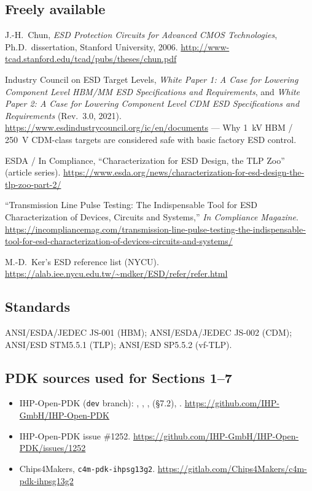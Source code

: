 \documentclass[11pt,a4paper]{article}
\newcommand{\cell}[1]{\texttt{#1}}
\begin{document}
\subsection*{Freely available}
\begin{enumerate}[label={[F\arabic*]}, leftmargin=*]
  \item J.-H.~Chun, \emph{ESD Protection Circuits for Advanced CMOS
        Technologies}, Ph.D.\ dissertation, Stanford University, 2006.
        \url{http://www-tcad.stanford.edu/tcad/pubs/theses/chun.pdf}
  \item Industry Council on ESD Target Levels, \emph{White Paper 1: A Case for
        Lowering Component Level HBM/MM ESD Specifications and Requirements},
        and \emph{White Paper 2: A Case for Lowering Component Level CDM ESD
        Specifications and Requirements} (Rev.~3.0, 2021).
        \url{https://www.esdindustrycouncil.org/ic/en/documents} --- Why
        \SI{1}{\kilo\volt} HBM / \SI{250}{\volt} CDM-class targets are
        considered safe with basic factory ESD control.
  \item ESDA / In Compliance, ``Characterization for ESD Design, the TLP Zoo''
        (article series).
        \url{https://www.esda.org/news/characterization-for-esd-design-the-tlp-zoo-part-2/}
  \item ``Transmission Line Pulse Testing: The Indispensable Tool for ESD
        Characterization of Devices, Circuits and Systems,'' \emph{In
        Compliance Magazine}.
        \url{https://incompliancemag.com/transmission-line-pulse-testing-the-indispensable-tool-for-esd-characterization-of-devices-circuits-and-systems/}
  \item M.-D.~Ker's ESD reference list (NYCU).
        \url{https://alab.iee.nycu.edu.tw/~mdker/ESD/refer/refer.html}
\end{enumerate}

\subsection*{Standards}
ANSI/ESDA/JEDEC JS-001 (HBM); ANSI/ESDA/JEDEC JS-002 (CDM);
ANSI/ESD STM5.5.1 (TLP); ANSI/ESD SP5.5.2 (vf-TLP).

\subsection*{PDK sources used for Sections 1--7}
\begin{itemize}
  \item IHP-Open-PDK (\cell{dev} branch):
        ,
        ,
        ,
         (\S7.2),
        .
        \url{https://github.com/IHP-GmbH/IHP-Open-PDK}
  \item IHP-Open-PDK issue \#1252.
        \url{https://github.com/IHP-GmbH/IHP-Open-PDK/issues/1252}
  \item Chips4Makers, \cell{c4m-pdk-ihpsg13g2}.
        \url{https://gitlab.com/Chips4Makers/c4m-pdk-ihpsg13g2}
\end{itemize}
\end{document}
